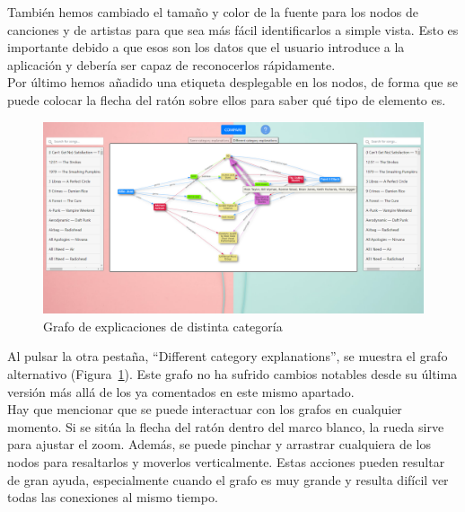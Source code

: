 También hemos cambiado el tamaño y color de la fuente para los nodos de canciones y de artistas para que sea más fácil identificarlos a simple vista. Esto es importante debido a que esos son los datos que el usuario introduce a la aplicación y debería ser capaz de reconocerlos rápidamente.\\

Por último hemos añadido una etiqueta desplegable en los nodos, de forma que se puede colocar la flecha del ratón sobre ellos para saber qué tipo de elemento es.\\

\begin{figure}[h!]
	\centering
	\includegraphics[width = 1\textwidth]{Imagenes/Bitmap/Pantalla different graph.png}
	\caption{Grafo de explicaciones de distinta categoría}
	\label{fig:distintaCategoria}
\end{figure}

Al pulsar la otra pestaña, ``Different category explanations'', se muestra el grafo alternativo (Figura~\ref{fig:distintaCategoria}). Este grafo no ha sufrido cambios notables desde su última versión más allá de los ya comentados en este mismo apartado.\\

Hay que mencionar que se puede interactuar con los grafos en cualquier momento. Si se sitúa la flecha del ratón dentro del marco blanco, la rueda sirve para ajustar el zoom. Además, se puede pinchar y arrastrar cualquiera de los nodos para resaltarlos y moverlos verticalmente. Estas acciones pueden resultar de gran ayuda, especialmente cuando el grafo es muy grande y resulta difícil ver todas las conexiones al mismo tiempo.\\

